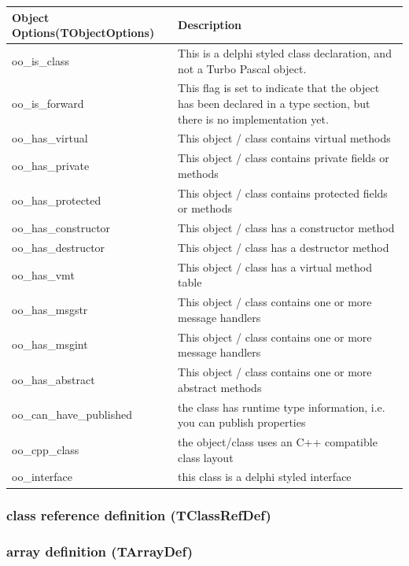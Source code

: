 \documentclass [a4paper,12pt]{article}
\begin{document}
\begin{longtable}{|l|p{10cm}|}
\hline
Object Options(TObjectOptions) & Description \\
\hline
\endhead
\hline
\endfoot
\textsf{oo{\_}is{\_}class}&
    This is a delphi styled class declaration, and not a Turbo Pascal
    object. \\
\textsf{oo{\_}is{\_}forward}&
    This flag is set to indicate that the object has been declared in a
    type section, but there is no implementation yet. \\
\textsf{oo{\_}has{\_}virtual}&
    This object / class contains virtual methods \\
\textsf{oo{\_}has{\_}private}&
    This object / class contains private fields or methods \\
\textsf{oo{\_}has{\_}protected}&
    This object / class contains protected fields or methods \\
\textsf{oo{\_}has{\_}constructor}&
    This object / class has a constructor method \\
\textsf{oo{\_}has{\_}destructor}&
    This object / class has a destructor method \\
\textsf{oo{\_}has{\_}vmt}&
    This object / class has a virtual method table \\
\textsf{oo{\_}has{\_}msgstr}&
    This object / class contains one or more message handlers  \\
\textsf{oo{\_}has{\_}msgint}&
    This object / class contains one or more message handlers  \\
\textsf{oo{\_}has{\_}abstract}&
    This object / class contains one or more abstract methods \\
\textsf{oo{\_}can{\_}have{\_}published}&
    the class has runtime type information, i.e. you can publish
    properties \\
\textsf{oo{\_}cpp{\_}class}&
    the object/class uses an C++ compatible class layout \\
\textsf{oo{\_}interface}&
    this class is a delphi styled interface
\end{longtable}

\subsubsection{class reference definition (TClassRefDef)}
\label{subsubsec:class}

\subsubsection{array definition (TArrayDef)}
\label{subsubsec:array}
\end{document}
